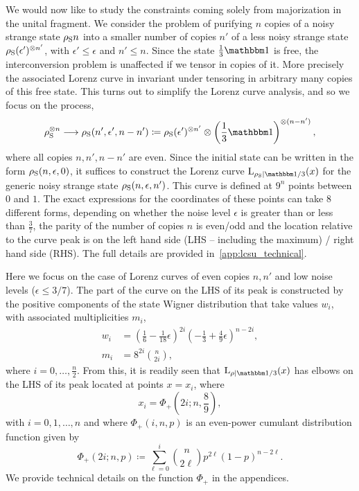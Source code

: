\documentclass[pra,
aps,
twocolumn,
superscriptaddress,
groupedaddress,
nofootinbib,
reprint
]{revtex4-1}
\begin{document}
We would now like to study the constraints coming solely from majorization in the unital fragment. 
We consider the problem of purifying $n$ copies of a noisy strange state $\rho_{\rm{S}}n$ into a smaller number of copies $n'$ of a less noisy strange state $\rho_{\rm{S}}(\epsilon')^{\otimes n'}$, with $\epsilon' \le \epsilon$ and $n' \leq n$. 
Since the state $\frac{1}{3} \id$ is free, the interconversion problem is unaffected if we tensor in copies of it. More precisely the associated Lorenz curve in invariant under tensoring in arbitrary many copies of this free state.
This turns out to simplify the Lorenz curve analysis, and so we focus on the process,
\begin{equation}\label{eq:sudist}
	\rho_{\rm{S}}^{\otimes n} \longrightarrow \rho_{\rm{S}}(n', \epsilon', n - n') \coloneqq  \rho_{\rm{S}}(\epsilon')^{\otimes n'} \otimes \left( \frac{1}{3}\id \right)^{\otimes (n-n')},
\end{equation}
where all copies $n, n', n - n'$ are even.
Since the initial state can be written in the form $\rho_{\rm{S}}(n, \epsilon, 0)$, it suffices to construct the Lorenz curve $\lc{\rho_{\rm{S}}}{\id/3}(x)$ for the generic noisy strange state $\rho_{\rm{S}}(n, \epsilon ,n')$.
This curve is defined at $9^n$ points between $0$ and $1$.
The exact expressions for the coordinates of these points can take $8$ different forms, depending on whether the noise level $\epsilon$ is greater than or less than $\frac{3}{7}$, the parity of the number of copies $n$ is even/odd and the location relative to the curve peak is on the left hand side (LHS -- including the maximum) / right hand side (RHS).
The full details are provided in~\cref{app:lcsu_technical}.

Here we focus on the case of Lorenz curves of even copies $n, n'$ and low noise levels ($\epsilon \leq 3/7$).
The part of the curve on the LHS of its peak is constructed by the positive components of the state Wigner distribution that take values $w_i$, with associated multiplicities $m_i$,
\begin{align}
	w_i &= \left( \frac{1}{6} - \frac{1}{18}\epsilon \right)^{2i}\left( -\frac{1}{3} + \frac{4}{9}\epsilon \right)^{n-2i}, \\
	m_i &= 8^{2i}\binom{n}{2i},
\end{align}
where $i=0,\dots,\frac{n}{2}$.
From this, it is readily seen that $\lc{\rho}{\id/3}(x)$ has elbows on the LHS of its peak located at points $x=x_i$, where
\begin{equation}
	x_i = \Phi_+ \left( 2i; n , \frac{8}{9} \right),
\end{equation}
with $i = 0,1, \dots , n$ and where $\Phi_+(i,n,p)$ is an even-power cumulant distribution function given by
\begin{equation}
	\Phi_+(2i; n, p) \coloneqq \sum_{\ell=0}^{i} \binom{n}{2\ell} p ^{2\ell} (1-p)^{n-2\ell}.
\end{equation}
We provide technical details on the function $\Phi_+$ in the appendices.
\end{document}
